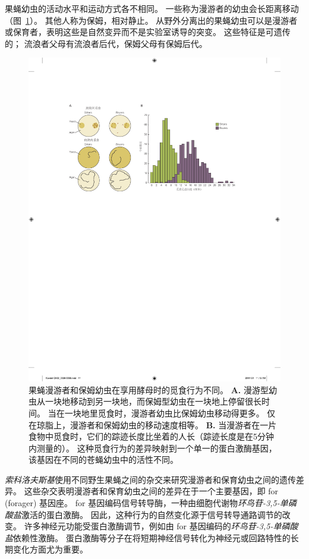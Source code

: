 果蝇幼虫的活动水平和运动方式各不相同。
一些称为漫游者的幼虫会长距离移动（图~\ref{fig:2_14}）。
其他人称为保姆，相对静止。
从野外分离出的果蝇幼虫可以是漫游者或保育者，表明这些是自然变异而不是实验室诱导的突变。
这些特征是可遗传的；
流浪者父母有流浪者后代，保姆父母有保姆后代。


\begin{figure}[htbp]
	\centering
	\includegraphics[width=0.75\linewidth]{chap02/fig_2_14}
	\caption{果蝇漫游者和保姆幼虫在享用酵母时的觅食行为不同\cite{sokolowski2001drosophila}。
		\textbf{A.} 漫游型幼虫从一块地移动到另一块地，而保姆型幼虫在一块地上停留很长时间。
		当在一块地里觅食时，漫游者幼虫比保姆幼虫移动得更多。
		仅在琼脂上，漫游者和保姆幼虫的移动速度相等。
		\textbf{B.} 当漫游者在一片食物中觅食时，它们的踪迹长度比坐着的人长（踪迹长度是在5分钟内测量的）。
		这种觅食行为的差异映射到一个单一的蛋白激酶基因，该基因在不同的苍蝇幼虫中的活性不同。}
	\label{fig:2_14}
\end{figure}


\textit{索科洛夫斯基}使用不同野生果蝇之间的杂交来研究漫游者和保育幼虫之间的遗传差异。
这些杂交表明漫游者和保育幼虫之间的差异在于一个主要基因，即 for (forager) 基因座。
for 基因编码信号转导酶，一种由细胞代谢物\textit{环鸟苷-3,5-单磷酸盐}激活的蛋白激酶。
因此，这种行为的自然变化源于信号转导通路调节的改变。
许多神经元功能受蛋白激酶调节，例如由 for 基因编码的\textit{环鸟苷-3,5-单磷酸盐}依赖性激酶。
蛋白激酶等分子在将短期神经信号转化为神经元或回路特性的长期变化方面尤为重要。


